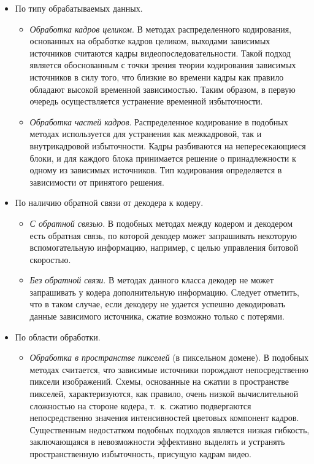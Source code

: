 \begin{itemize}
    \item По типу обрабатываемых данных.
    \begin{itemize}
        \item \emph{Обработка кадров целиком}. В методах распределенного кодирования, основанных на обработке кадров целиком, выходами зависимых источников считаются кадры видеопоследовательности. Такой подход является обоснованным с точки зрения теории кодирования зависимых источников в силу того, что близкие во времени кадры как правило обладают высокой временной зависимостью. Таким образом, в первую очередь осуществляется устранение временной избыточности.
        \item \emph{Обработка частей кадров}. Распределенное кодирование в подобных методах используется для устранения как межкадровой, так и внутрикадровой избыточности. Кадры разбиваются на непересекающиеся блоки, и для каждого блока принимается решение о принадлежности к одному из зависимых источников. Тип кодирования определяется в зависимости от принятого решения.
    \end{itemize}
    \item По наличию обратной связи от декодера к кодеру.
    \begin{itemize}
        \item \emph{С обратной связью}. В подобных методах между кодером и декодером есть обратная связь, по которой декодер может запрашивать некоторую вспомогательную информацию, например, с целью управления битовой скоростью.
        \item \emph{Без обратной связи}. В методах данного класса декодер не может запрашивать у кодера дополнительную информацию. Следует отметить, что в таком случае, если декодеру не удается успешно декодировать данные зависимого источника, сжатие возможно только с потерями.
    \end{itemize}
    \item По области обработки.
    \begin{itemize}
        \item \emph{Обработка в пространстве пикселей} (в пиксельном домене). В подобных методах считается, что зависимые источники порождают непосредственно пиксели изображений. Схемы, основанные на сжатии в пространстве пикселей, характеризуются, как правило, очень низкой вычислительной сложностью на стороне кодера, т.~к. сжатию подвергаются непосредственно значения интенсивностей цветовых компонент кадров. Существенным недостатком подобных подходов является низкая гибкость, заключающаяся в невозможности эффективно выделять и устранять пространственную избыточность, присущую кадрам видео.

\end{itemize}
\end{itemize}
